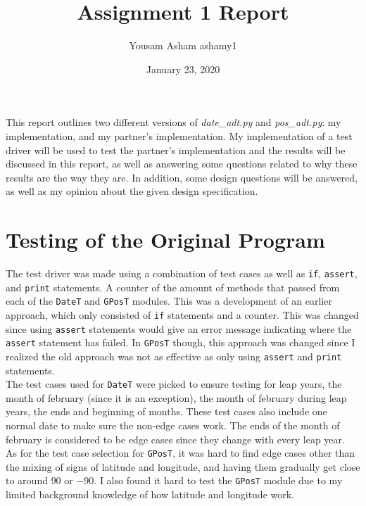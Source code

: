 \documentclass[12pt]{article}
\title{Assignment 1 Report}
\author{Yousam Asham ashamy1}
\date{January 23, 2020}
\begin{document}
\maketitle

This report outlines two different versions of \textit{date\_adt.py} and \textit{pos\_adt.py}: my implementation, and my partner's implementation. My implementation of a test driver will be used to test the partner's implementation and the results will be discussed in this report, as well as answering some questions related to why these results are the way they are. In addition, some design questions will be answered, as well as my opinion about the given design specification.

\section{Testing of the Original Program}

        The test driver was made using a combination of test cases as well as \verb|if|, \verb|assert|, and \verb|print| statements. A counter of the amount of methods that passed from each of the \verb|DateT| and \verb|GPosT| modules. This was a development of an earlier approach, which only consisted of \verb|if| statements and a counter. This was changed since using \verb|assert| statements would give an error message indicating where the \verb|assert| statement has failed. In \verb|GPosT| though, this approach was changed since I realized the old approach was not as effective as only using \verb|assert| and \verb|print| statements.\\

        The test cases used for \verb|DateT| were picked to ensure testing for leap years, the month of february (since it is an exception), the month of february during leap years, the ends and beginning of months. These test cases also include one normal date to make sure the non-edge cases work. The ends of the month of february is considered to be edge cases since they change with every leap year.\\

        As for the test case selection for \verb|GPosT|, it was hard to find edge cases other than the mixing of signs of latitude and longitude, and having them gradually get close to around $90$ or $-90$. I also found it hard to test the \verb|GPosT| module due to my limited background knowledge of how latitude and longitude work.\\
\end{document}
